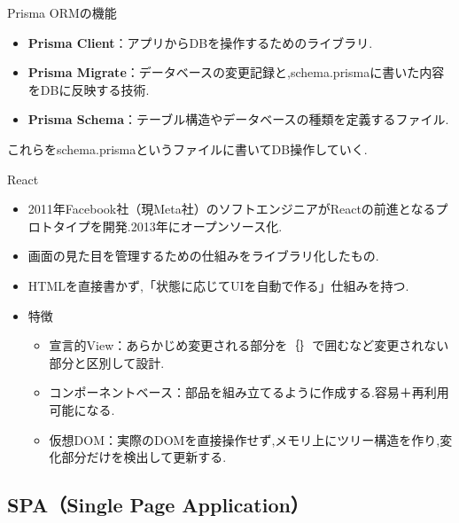 \documentclass[aspectratio=169]{beamer}
\begin{document}
\begin{frame}{Prisma ORMの機能}
    \begin{itemize}
        \setlength{\parskip}{1em}
        \item \textbf{Prisma Client}：アプリからDBを操作するためのライブラリ.
        \item \textbf{Prisma Migrate}：データベースの変更記録と,schema.prismaに書いた内容をDBに反映する技術.
        \item \textbf{Prisma Schema}：テーブル構造やデータベースの種類を定義するファイル.
        
    \end{itemize}
    \rightarrow これらをschema.prismaというファイルに書いてDB操作していく.
\end{frame}

\begin{frame}{React}
    \begin{itemize}
        \setlength{\parskip}{1em}
        \item 2011年Facebook社（現Meta社）のソフトエンジニアがReactの前進となるプロトタイプを開発.2013年にオープンソース化.
        \item 画面の見た目を管理するための仕組みをライブラリ化したもの.
        \item HTMLを直接書かず,「状態に応じてUIを自動で作る」仕組みを持つ.
        \item 特徴
        \begin{itemize}
            \setlength{\parskip}{1em}
            \item 宣言的View：あらかじめ変更される部分を｛｝で囲むなど変更されない部分と区別して設計.
            \item コンポーネントベース：部品を組み立てるように作成する.容易＋再利用可能になる.
            \item 仮想DOM：実際のDOMを直接操作せず,メモリ上にツリー構造を作り,変化部分だけを検出して更新する.
        \end{itemize}
    \end{itemize}    
\end{frame}

\subsection{SPA（Single Page Application）}
\end{document}
